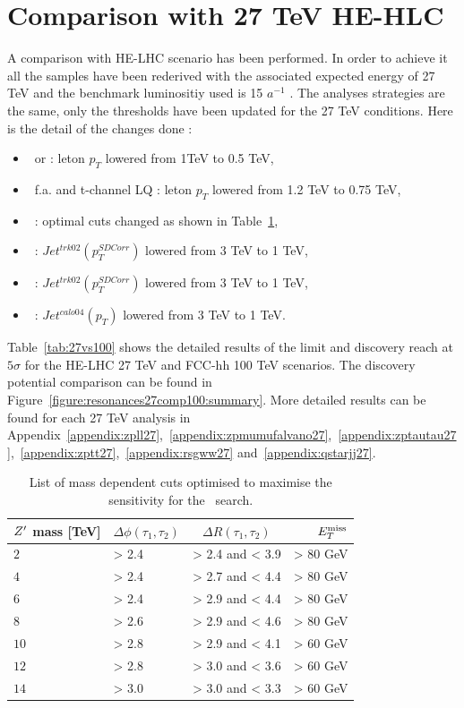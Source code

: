 \section{Comparison with 27 TeV HE-HLC}
\label{sec:ana27tev}
A comparison with HE-LHC scenario has been performed.
In order to achieve it all the samples have been rederived with the associated expected energy of 27 TeV and the benchmark luminositiy used is 15 $a^{-1}$ .
\newline
The analyses strategies are the same, only the thresholds have been updated for the 27 TeV conditions. Here is the detail of the changes done :
\begin{itemize}
\item \Zpee\ or \Zpmumu : leton $p_T$ lowered from 1TeV to 0.5 TeV,
\item \Zpmumu\ f.a. and t-channel LQ : leton $p_T$ lowered from  1.2 TeV to 0.75 TeV,
\item \Zptata\ : optimal cuts changed as shown in Table~\ref{tab:leptonicresonances:selectiontautau27},
\item \rsg\ : $Jet^{trk02}(p_T^{SD Corr})$ lowered from 3 TeV to 1 TeV,
\item \Zptt\ : $Jet^{trk02}(p_T^{SD Corr})$ lowered from 3 TeV to 1 TeV,
\item \qjj\ : $Jet^{calo04}(p_T)$ lowered from 3 TeV to 1 TeV.
\end{itemize}

Table~\ref{tab:27vs100} shows the detailed results of the limit and discovery reach at $5\sigma$ for the HE-LHC 27 TeV and FCC-hh 100 TeV scenarios.
The discovery potential comparison can be found in Figure~\ref{figure:resonances27comp100:summary}.
More detailed results can be found for each 27 TeV analysis in Appendix~\ref{appendix:zpll27},~\ref{appendix:zpmumufalvano27},~\ref{appendix:zptautau27},~\ref{appendix:zptt27},~\ref{appendix:rsgww27}  and~\ref{appendix:qstarjj27}.

\begin{table}[htbp]
   \centering
\begin{tabular}{|l|l|c|r|}
  \hline
  \hline
   $Z^{\prime}$ mass [TeV] &  $\Delta \phi(\tau_1, \tau_2)$&  $\Delta R(\tau_1, \tau_2)$ & $E_{T}^{\rm{miss}}$\\
  \hline
   $2$ & > 2.4 & > 2.4 and < 3.9 & > 80 GeV\\
   $4$ & > 2.4 & > 2.7 and < 4.4 & > 80 GeV\\
   $6$ & > 2.4 & > 2.9 and < 4.4 & > 80 GeV\\
   $8$ & > 2.6 & > 2.9 and < 4.6 & > 80 GeV\\
  $10$ & > 2.8 & > 2.9 and < 4.1 & > 60 GeV\\
  $12$ & > 2.8 & > 3.0 and < 3.6 & > 60 GeV\\
  $14$ & > 3.0 & > 3.0 and < 3.3 & > 60 GeV\\
  \hline
  \hline
  \end{tabular}
  \caption{List of mass dependent cuts optimised to maximise the sensitivity for the \Zptata\ search.}
  \label{tab:leptonicresonances:selectiontautau27}
\end{table}

